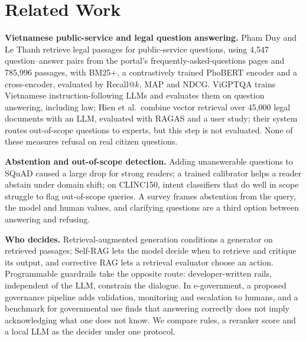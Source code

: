 \section{Related Work}

\textbf{Vietnamese public-service and legal question answering.} Pham Duy and Le Thanh retrieve legal passages for public-service
questions, using 4,547 question--answer pairs from the portal's frequently-asked-questions pages and 785,996 passages, with BM25+, a
contrastively trained PhoBERT encoder and a cross-encoder, evaluated by Recall@$k$, MAP and NDCG\cite{phamduy2023}. ViGPTQA trains
Vietnamese instruction-following LLMs and evaluates them on question answering, including law\cite{vigptqa2023}; Hien et al.\ combine
vector retrieval over 45,000 legal documents with an LLM, evaluated with RAGAS and a user study\cite{hien2025}; their system routes
out-of-scope questions to experts, but this step is not evaluated. None of these measures refusal on real citizen questions.

\textbf{Abstention and out-of-scope detection.} Adding unanswerable questions to SQuAD caused a large drop for strong
readers\cite{rajpurkar2018}; a trained calibrator helps a reader abstain under domain shift\cite{kamath2020}; on CLINC150, intent
classifiers that do well in scope struggle to flag out-of-scope queries\cite{larson2019}. A survey frames abstention from the query, the
model and human values\cite{wen2025}, and clarifying questions are a third option between answering and refusing\cite{aliannejadi2019}.

\textbf{Who decides.} Retrieval-augmented generation conditions a generator on retrieved passages\cite{lewis2020}; Self-RAG lets the model
decide when to retrieve and critique its output\cite{asai2024}, and corrective RAG lets a retrieval evaluator choose an
action\cite{yan2024}. Programmable guardrails take the opposite route: developer-written rails, independent of the LLM, constrain the
dialogue\cite{rebedea2023}. In e-government, a proposed governance pipeline adds validation, monitoring and escalation to
humans\cite{kaplan2026}, and a benchmark for governmental use finds that answering correctly does not imply acknowledging what one does
not know\cite{samson2026}. We compare rules, a reranker score and a local LLM as the decider under one protocol.
